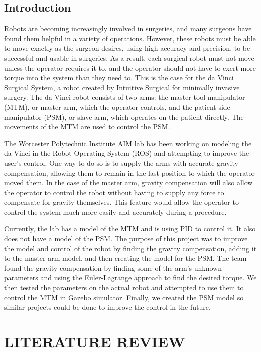 \documentclass[conference]{IEEEtran}
\begin{document}
\subsection{Introduction}
Robots are becoming increasingly involved in surgeries, and many surgeons have found them helpful in a variety of operations. However, these robots must be able to move exactly as the surgeon desires, using high accuracy and precision, to be successful and usable in surgeries. As a result, each surgical robot must not move unless the operator requires it to, and the operator should not have to exert more torque into the system than they need to. This is the case for the da Vinci Surgical System, a robot created by Intuitive Surgical for minimally invasive surgery. The da Vinci robot consists of two arms: the master tool manipulator (MTM), or master arm, which the operator controls, and the patient side manipulator (PSM), or slave arm, which operates on the patient directly. The movements of the MTM are used to control the PSM. 

The Worcester Polytechnic Institute AIM lab has been working on modeling the da Vinci in the Robot Operating System (ROS) and attempting to improve the user's control. One way to do so is to supply the arms with accurate gravity compensation, allowing them to remain in the last position to which the operator moved them. In the case of the master arm, gravity compensation will also allow the operator to control the robot without having to supply any force to compensate for gravity themselves. This feature would allow the operator to control the system much more easily and accurately during a procedure. 

Currently, the lab has a model of the MTM and is using PID to control it. It also does not have a model of the PSM. The purpose of this project was to improve the model and control of the robot by finding the gravity compensation, adding it to the master arm model, and then creating the model for the PSM. The team found the gravity compensation by finding some of the arm’s unknown parameters and using the Euler-Lagrange approach to find the desired torque. We then tested the parameters on the actual robot and attempted to use them to control the MTM in Gazebo simulator. Finally, we created the PSM model so similar projects could be done to improve the control in the future.


\section{LITERATURE REVIEW}
\end{document}
